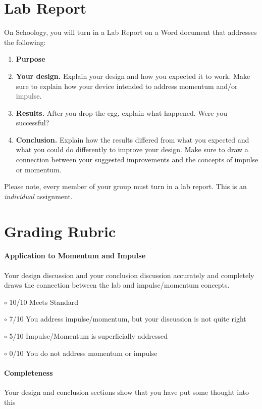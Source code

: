 \documentclass[10pt]{exam}
\begin{document}
\pagebreak
\section*{Lab Report}

On Schoology, you will turn in a Lab Report on a Word document that addresses the following:
%
\begin{enumerate}
  \item {\bf Purpose}
  \item {\bf Your design.} Explain your design and how you expected it to work.  Make sure to explain how your device intended to address momentum and/or impulse.
  \item {\bf Results.} After you drop the egg, explain what happened. Were you successful?
  \item {\bf Conclusion.}  Explain how the results differed from what you expected and what you could do differently to improve your design.  Make sure to draw a connection between your suggested improvements and the concepts of impulse or momentum.
\end{enumerate}
%
Please note, every member of your group must turn in a lab report.  This is an \emph{individual} assignment.

\section*{Grading Rubric}

\paragraph{Application to Momentum and Impulse} Your design discussion and your conclusion discussion accurately and completely draws the connection between the lab and impulse/momentum concepts.

$\circ$ 10/10 Meets Standard \hfill

$\circ$ 7/10 You address impulse/momentum, but your discussion is not quite right \hfill

$\circ$ 5/10 Impulse/Momentum is superficially addressed \hfill

$\circ$ 0/10 You do not address momentum or impulse \hfill


\paragraph{Completeness}  Your design and conclusion sections show that you have put some thought into this
\end{document}

